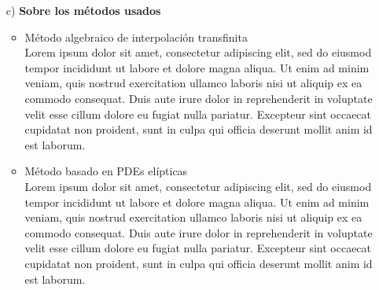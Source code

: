 \documentclass{article}
\begin{document}
\begin{enumerate}
\begin{itemize}
\begin{itemize}
	\end{itemize}



\item[c)] \textbf{ Sobre los m\'etodos usados }
\\
	
	\begin{itemize}

		\item M\'etodo algebraico de interpolaci\'on transfinita
		\\
		Lorem ipsum dolor sit amet, consectetur adipiscing elit, sed do eiusmod tempor incididunt ut labore et dolore magna aliqua. Ut enim ad minim veniam, quis nostrud exercitation ullamco laboris nisi ut aliquip ex ea commodo consequat. Duis aute irure dolor in reprehenderit in voluptate velit esse cillum dolore eu fugiat nulla pariatur. Excepteur sint occaecat cupidatat non proident, sunt in culpa qui officia deserunt mollit anim id est laborum.	

		\item M\'etodo basado en PDEs el\'ipticas
		\\
		Lorem ipsum dolor sit amet, consectetur adipiscing elit, sed do eiusmod tempor incididunt ut labore et dolore magna aliqua. Ut enim ad minim veniam, quis nostrud exercitation ullamco laboris nisi ut aliquip ex ea commodo consequat. Duis aute irure dolor in reprehenderit in voluptate velit esse cillum dolore eu fugiat nulla pariatur. Excepteur sint occaecat cupidatat non proident, sunt in culpa qui officia deserunt mollit anim id est laborum.
		\\

	\end{itemize}



\end{itemize}

\end{enumerate}
\end{document}
